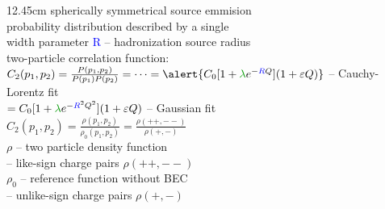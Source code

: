 \documentclass[xcolor=dvipsnames]{beamer}
\begin{document}
\begin{frame}
\begin{textblock*}{12.45cm}
{spherically symmetrical source emmision \\probability distribution described by a single \\width parameter \textcolor{blue}{R} -- hadronization source radius\\\vspace{0.4cm}
two-particle correlation function:\\\vspace{0.1cm}
$C_2(p_1,p_2)=\frac{P(p_1,p_2)}{P(p_1)P(p_2)} = \cdots =\alert{C_0[1+\textcolor{dgreen}{\lambda} e^{-\textcolor{blue}{R}Q}](1+\varepsilon Q)}$ -- Cauchy-Lorentz fit\\%
\hspace{4.36cm}$=C_0[1+\textcolor{dgreen}{\lambda} e^{-\textcolor{blue}{R}^2Q^2}](1+\varepsilon Q)$ -- Gaussian fit\\\vspace{0.35cm}
$C_2(p_1,p_2)=\frac{\rho(p_1,p_2)}{\rho_0(p_1,p_2)}=\frac{\rho(++,--)}{\rho(+,-)}$\\
\vspace{0.35cm}
$\rho$ -- two particle density function\\\vspace{0.05cm}
\hspace{0.3cm}-- like-sign charge pairs $\rho(++,--)$\\\vspace{0.2cm}
$\rho_0$ -- reference function without BEC \\\vspace{0.05cm}
\hspace{0.45cm}-- unlike-sign charge pairs $\rho(+,-)$\\\vspace{0.3cm}
}


\end{textblock*}
\end{frame}
\end{document}

